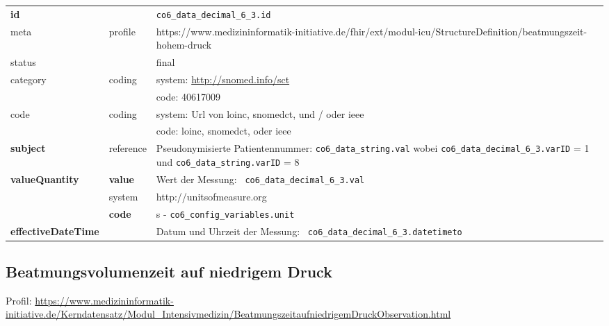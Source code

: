 \begin{longtable}{|l|l|p{7.5cm}|}
	\hline
	\rowcolor{lightgray} \multicolumn{3}{|l|}{Data Mapping (inhaltlich)} \\ \hline
	\textbf{id} &  & \texttt{co6\_data\_decimal\_6\_3.id} \\ \hline
	meta & profile & https://www.medizininformatik-initiative.de/fhir/ext/modul-icu/StructureDefinition/beatmungszeit-hohem-druck \\ \hline 
	status &  & final   \\ \hline 
	category & coding & system: \url{http://snomed.info/sct} \\
	\cline{3-3}
	& & code: 40617009 \\ \hline
	code & coding & system: Url von \ac{loinc}, \ac{snomedct}, und / oder \ac{ieee} \\ 
	\cline{3-3} 
	&  & code: \ac{loinc}, \ac{snomedct}, oder \ac{ieee} \\ \hline
	\textbf{subject} & reference & Pseudonymisierte Patientennummer: \texttt{co6\_data\_string.val} wobei \texttt{co6\_data\_decimal\_6\_3.varID} = 1 und \texttt{co6\_data\_string.varID} = 8 \\ \hline
	\textbf{valueQuantity}  & \textbf{value} & Wert der Messung: \texttt{
		co6\_data\_decimal\_6\_3.val} \\
	\cline{2-3}
	& system & http://unitsofmeasure.org \\
	\cline{2-3}
	& \textbf{code} & s - \texttt{co6\_config\_variables.unit}
	\\ \hline
	\textbf{effectiveDateTime}  & & Datum und Uhrzeit der Messung: \texttt{
		co6\_data\_decimal\_6\_3.datetimeto} \\
	\hline
\end{longtable}

\subsection{Beatmungsvolumenzeit auf niedrigem Druck} 
Profil: \url{https://www.medizininformatik-initiative.de/Kerndatensatz/Modul_Intensivmedizin/BeatmungszeitaufniedrigemDruckObservation.html}

